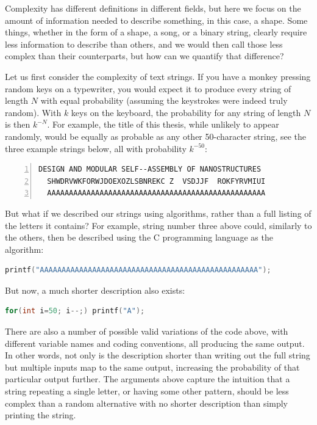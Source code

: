 Complexity has different definitions in different fields, but here we focus on the amount of information needed to describe something, in this case, a shape. Some things, whether in the form of a shape, a song, or a binary string, clearly require less information to describe than others, and we would then call those less complex than their counterparts, but how can we quantify that difference?

Let us first consider the complexity of text strings. If you have a monkey pressing random keys on a typewriter, you would expect it to produce every string of length \(N\) with equal probability (assuming the keystrokes were indeed truly random). With \(k\) keys on the keyboard, the probability for any string of length \(N\) is then \(k^{-N}\). For example, the title of this thesis, while unlikely to appear randomly, would be equally as probable as any other 50-character string, see the three example strings below, all with probability \(k^{-50}\):
\begin{lstlisting}[numbers=left]
  DESIGN AND MODULAR SELF--ASSEMBLY OF NANOSTRUCTURES
  SHWDRVWKFORWJDOEXOZLSBNREKC Z  VSDJJF  ROKFYRVMIUI
  AAAAAAAAAAAAAAAAAAAAAAAAAAAAAAAAAAAAAAAAAAAAAAAAAA
\end{lstlisting}

But what if we described our strings using algorithms, rather than a full listing of the letters it contains? For example, string number three above could, similarly to the others, then be described using the C programming language as the algorithm:
\begin{lstlisting}[language=c]
printf("AAAAAAAAAAAAAAAAAAAAAAAAAAAAAAAAAAAAAAAAAAAAAAAAAA");
\end{lstlisting}
But now, a much shorter description also exists:
\begin{lstlisting}[language=c]
for(int i=50; i--;) printf("A");
\end{lstlisting}

There are also a number of possible valid variations of the code above, with different variable names and coding conventions, all producing the same output. In other words, not only is the description shorter than writing out the full string but multiple inputs map to the same output, increasing the probability of that particular output further. The arguments above capture the intuition that a string repeating a single letter, or having some other pattern, should be less complex than a random alternative with no shorter description than simply printing the string. 


